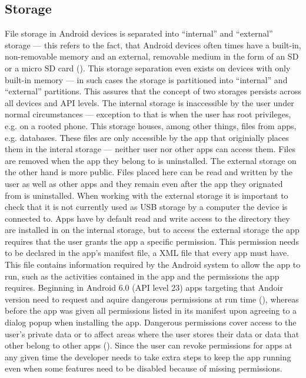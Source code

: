 \subsection{Storage}
\label{android_storage}
File storage in Android devices is separated into ``internal'' and ``external'' storage --- this refers to the fact, that Android devices often times have a built-in, non-removable memory and an external, removable medium in the form of an SD or a micro SD card (\cite{android_storage}). This storage separation even exists on devices with only built-in memory --- in such cases the storage is partitioned into ``internal'' and ``external'' partitions. This assures that the concept of two storages persists across all devices and \gls{API} levels. The internal storage is inaccessible by the user under normal circumstances --- exception to that is when the user has root privileges, e.g. on a rooted phone. This storage houses, among other things, files from apps, e.g. databases. These files are only accessible by the app that originially places them in the interal storage --- neither user nor other apps can access them. Files are removed when the app they belong to is uninstalled. 
The external storage on the other hand is more public. Files placed here can be read and written by the user as well as other apps and they remain even after the app they orignated from is uninstalled. When working with the external storage it is important to check that it is not currently used as \gls{USB} storage by a computer the device is connected to.
Apps have by default read and write access to the directory they are installed in on the internal storage, but to access the external storage the app requires that the user grants the app a specific permission. This permission needs to be declared in the app's manifest file, a XML file that every app must have. This file contains information required by the Android system to allow the app to run, such as the activities contained in the app and the permissions the app requires. Beginning in Android 6.0 (\gls{API} level 23) apps targeting that Andoir version need to request and aquire dangerous permissions at run time (\cite{android_permissions}), whereas before the app was given all permissions listed in its manifest upon agreeing to a dialog popup when installing the app. Dangerous permissions cover access to the user's private data or to affect areas where the user stores their data or data that other belong to other apps (\cite{android_permissions}). Since the user can revoke permissions for apps at any given time the developer needs to take extra steps to keep the app running even when some features need to be disabled because of missing permissions.  

